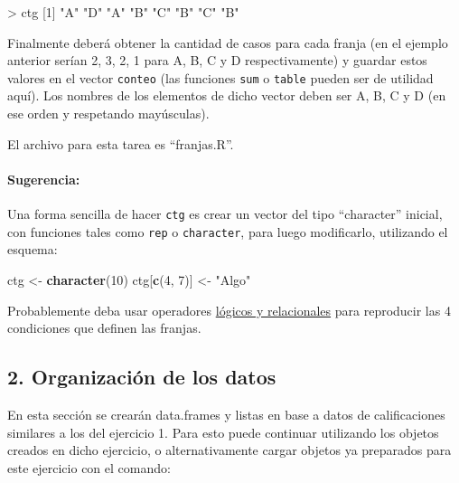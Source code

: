 \documentclass[]{article}
\newenvironment{Shaded}{}{}
\newcommand{\KeywordTok}[1]{\textcolor[rgb]{0.00,0.44,0.13}{\textbf{{#1}}}}
\newcommand{\DecValTok}[1]{\textcolor[rgb]{0.25,0.63,0.44}{{#1}}}
\newcommand{\StringTok}[1]{\textcolor[rgb]{0.25,0.44,0.63}{{#1}}}
\newcommand{\NormalTok}[1]{{#1}}
\begin{document}
\begin{Shaded}
\begin{Highlighting}[]
\NormalTok{> ctg}
\NormalTok{[}\DecValTok{1}\NormalTok{] }\StringTok{"A"} \StringTok{"D"} \StringTok{"A"} \StringTok{"B"} \StringTok{"C"} \StringTok{"B"} \StringTok{"C"} \StringTok{"B"} 
\end{Highlighting}
\end{Shaded}
Finalmente deberá obtener la cantidad de casos para cada franja (en el
ejemplo anterior serían 2, 3, 2, 1 para A, B, C y D respectivamente) y
guardar estos valores en el vector \texttt{conteo} (las funciones
\texttt{sum} o \texttt{table} pueden ser de utilidad aquí). Los nombres
de los elementos de dicho vector deben ser A, B, C y D (en ese orden y
respetando mayúsculas).

El archivo para esta tarea es ``franjas.R''.

\paragraph{Sugerencia:}

Una forma sencilla de hacer \texttt{ctg} es crear un vector del tipo
``character'' inicial, con funciones tales como \texttt{rep} o
\texttt{character}, para luego modificarlo, utilizando el esquema:

\begin{Shaded}
\begin{Highlighting}[]
\NormalTok{ctg <- }\KeywordTok{character}\NormalTok{(}\DecValTok{10}\NormalTok{)}
\NormalTok{ctg[}\KeywordTok{c}\NormalTok{(}\DecValTok{4}\NormalTok{, }\DecValTok{7}\NormalTok{)] <- }\StringTok{"Algo"}
\end{Highlighting}
\end{Shaded}
Probablemente deba usar operadores
\href{http://eva.universidad.edu.uy/mod/resource/view.php?id=94745}{lógicos
y relacionales} para reproducir las 4 condiciones que definen las
franjas.

\subsection{2. Organización de los datos}

En esta sección se crearán data.frames y listas en base a datos de
calificaciones similares a los del ejercicio 1. Para esto puede
continuar utilizando los objetos creados en dicho ejercicio, o
alternativamente cargar objetos ya preparados para este ejercicio con el
comando:
\end{document}
